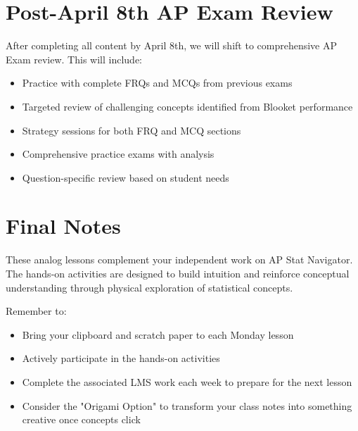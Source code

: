 \documentclass[11pt]{article}
\begin{document}
\section*{\textcolor{lynnmaroon}{Post-April 8th AP Exam Review}}

After completing all content by April 8th, we will shift to comprehensive AP Exam review. This will include:

\begin{itemize}[leftmargin=*]
  \item Practice with complete FRQs and MCQs from previous exams
  \item Targeted review of challenging concepts identified from Blooket performance
  \item Strategy sessions for both FRQ and MCQ sections
  \item Comprehensive practice exams with analysis
  \item Question-specific review based on student needs
\end{itemize}

\section{Final Notes}

These analog lessons complement your independent work on AP Stat Navigator. The hands-on activities are designed to build intuition and reinforce conceptual understanding through physical exploration of statistical concepts.

Remember to:
\begin{itemize}[leftmargin=*]
  \item Bring your clipboard and scratch paper to each Monday lesson
  \item Actively participate in the hands-on activities
  \item Complete the associated LMS work each week to prepare for the next lesson
  \item Consider the "Origami Option" to transform your class notes into something creative once concepts click
\end{itemize}
\end{document}
